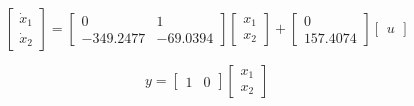 \begin{equation}
  \begin{bmatrix}
    \dot x_1 \\
    \dot x_2
\end{bmatrix} =
\begin{bmatrix}
  0 & 1\\
  -349.2477 & -69.0394
\end{bmatrix}
\begin{bmatrix}
  x_1\\
  x_2
\end{bmatrix}
+
\begin{bmatrix}
  0\\
  157.4074
\end{bmatrix}
\begin{bmatrix}
  u
\end{bmatrix}
\end{equation}

\begin{equation}
  y = 
  \begin{bmatrix}
1 & 0
\end{bmatrix}
\begin{bmatrix}
  x_1\\
  x_2
\end{bmatrix} 
\end{equation}

\newpage

\begin{tcolorbox}[sharp corners, colframe=bluebox, title= Respuesta
  del sistema en tiempo continuo]
  \vspace*{0.35em}
\vspace*{0.35em}
  \end{tcolorbox}%